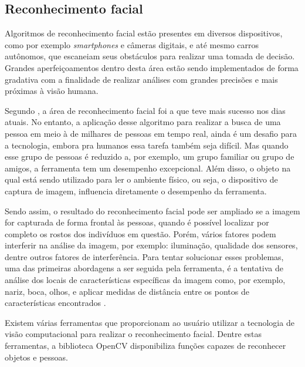 \subsection{Reconhecimento facial}

Algoritmos de reconhecimento facial estão presentes em diversos dispositivos, como por exemplo \textit{smartphones} e câmeras digitais, e até mesmo carros autônomos, que escaneiam seus obstáculos para realizar uma tomada de decisão. Grandes aperfeiçoamentos dentro desta área estão sendo implementados de forma gradativa com a finalidade de realizar análises com grandes precisões e mais próximas à visão humana.

Segundo , a área de reconhecimento facial foi a que teve mais sucesso nos dias atuais. No entanto, a aplicação desse algoritmo para realizar a busca de uma pessoa em meio à de milhares de pessoas em tempo real, ainda é um desafio para a tecnologia, embora pra humanos essa tarefa também seja difícil. Mas quando esse grupo de pessoas é reduzido a, por exemplo, um grupo familiar ou grupo de amigos, a ferramenta tem um desempenho excepcional. Além disso, o objeto na qual está sendo utilizado para ler o ambiente físico, ou seja, o dispositivo de captura de imagem, influencia diretamente o desempenho da ferramenta.

Sendo assim, o resultado do reconhecimento facial pode ser ampliado se a imagem for capturada de forma frontal às pessoas, quando é possível localizar por completo os rostos dos indivíduos em questão. Porém, vários fatores podem interferir na análise da imagem, por exemplo: iluminação, qualidade dos sensores, dentre outros fatores de interferência. Para tentar solucionar esses problemas, uma das primeiras abordagens a ser seguida pela ferramenta, é a tentativa de análise dos locais de características específicas da imagem como, por exemplo, nariz, boca, olhos, e aplicar medidas de distância entre os pontos de características encontrados \cite{SZELISKI2010}.

Existem várias ferramentas que proporcionam ao usuário utilizar a tecnologia de visão computacional para realizar o reconhecimento facial. Dentre estas ferramentas, a biblioteca OpenCV disponibiliza funções capazes de reconhecer objetos e pessoas. 